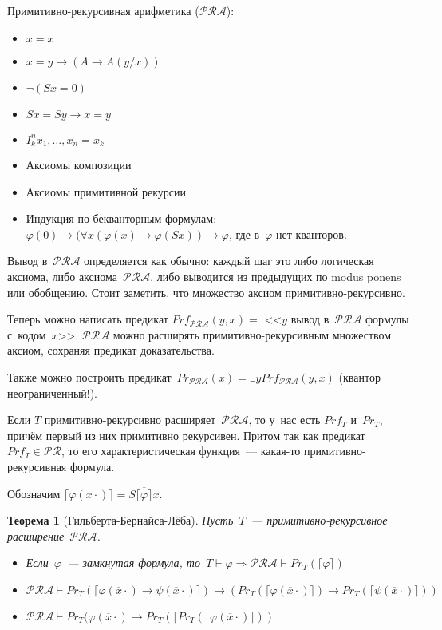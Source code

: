 \documentclass{article}
\newtheorem{theorem}{Теорема}
\theoremstyle{remark}
\renewcommand{\phi}{\varphi}
\begin{document}
Примитивно-рекурсивная арифметика ($\mathcal{PRA}$):
\begin{itemize}
  \item $x = x$
  \item $x = y \rightarrow (A \rightarrow A(y / x))$
  \item $\neg(Sx = 0)$
  \item $Sx = Sy \rightarrow x = y$
  \item $I^n_k x_1, \ldots, x_n = x_k$
  \item Аксиомы композиции
  \item Аксиомы примитивной рекурсии
  \item Индукция по бекванторным формулам: $\phi(0) \rightarrow (\forall
    x(\phi(x) \rightarrow \phi(Sx)) \rightarrow \phi$, где в~$\phi$ нет
    кванторов.
\end{itemize}

Вывод в~$\mathcal{PRA}$ определяется как обычно: каждый шаг это либо логическая
аксиома, либо аксиома~$\mathcal{PRA}$, либо выводится из предыдущих по modus
ponens или обобщению. Стоит заметить, что множество аксиом
примитивно-рекурсивно.

Теперь можно написать предикат $Prf_{\mathcal{PRA}}(y, x) = $ <<$y$ вывод
в~$\mathcal{PRA}$ формулы с~кодом~$x$>>. $\mathcal{PRA}$ можно расширять
примитивно-рекурсивным множеством аксиом, сохраняя предикат доказательства.

Также можно построить предикат~$Pr_{\mathcal{PRA}}(x) = \exists y
Prf_{\mathcal{PRA}}(y, x)$ (квантор неограниченный!).

Если $T$ примитивно-рекурсивно расширяет~$\mathcal{PRA}$, то у~нас есть
$Prf_T$ и~$Pr_T$, причём первый из них примитивно рекурсивен. Притом так как
предикат~$Prf_T \in \mathcal{PR}$, то его характеристическая функция~---
какая-то примитивно-рекурсивная формула.

Обозначим $\lceil \phi(x \cdot) \rceil = S\overline{\lceil \phi
\rceil} x$.

\begin{theorem}[Гильберта-Бернайса-Лёба]
  Пусть~$T$~--- примитивно-рекурсивное расширение~$\mathcal{PRA}$.
  \begin{itemize}
    \item Если~$\phi$~--- замкнутая формула, то~$T \vdash \phi \Rightarrow
      \mathcal{PRA} \vdash Pr_T(\lceil \phi \rceil)$
    \item $\mathcal{PRA} \vdash Pr_T(\lceil \phi(\overline{x}\cdot) \rightarrow
      \psi(\overline{x}\cdot) \rceil) \rightarrow (Pr_T(\lceil \phi
      (\overline{x}\cdot) \rceil) \rightarrow Pr_T(\lceil
      \psi(\overline{x}\cdot)\rceil))$
    \item $\mathcal{PRA} \vdash Pr_T(\phi(\overline{x}\cdot) \rightarrow
      Pr_T(\lceil Pr_T(\lceil \phi(\overline{x}\cdot) \rceil))$
  \end{itemize}
\end{theorem}
\end{document}
